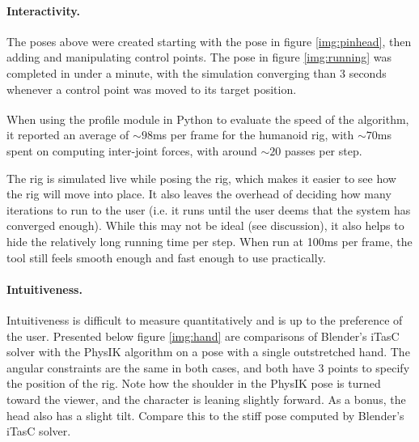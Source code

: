 \documentclass[10pt,twocolumn,letterpaper]{article}
\begin{document}
\paragraph{Interactivity.} The poses above were created starting with the pose in figure \ref{img:pinhead}, then adding and manipulating control points. The pose in figure \ref{img:running} was completed in under a minute, with the simulation converging than 3 seconds whenever a control point was moved to its target position.

When using the profile module in Python\textsuperscript{\cite{Pr}} to evaluate the speed of the algorithm, it reported an average of $\sim 98$ms per frame for the humanoid rig, with $\sim 70$ms spent on computing inter-joint forces, with around $\sim 20$ passes per step. 

The rig is simulated live while posing the rig, which makes it easier to see how the rig will move into place. It also leaves the overhead of deciding how many iterations to run to the user (i.e. it runs until the user deems that the system has converged enough). While this may not be ideal (see discussion), it also helps to hide the relatively long running time per step. When run at 100ms per frame, the tool still feels smooth enough and fast enough to use practically.

\paragraph{Intuitiveness.} Intuitiveness is difficult to measure quantitatively and is up to the preference of the user. Presented below figure \ref{img:hand} are comparisons of Blender's iTasC solver with the PhysIK algorithm on a pose with a single outstretched hand. The angular constraints are the same in both cases, and both have 3 points to specify the position of the rig. Note how the shoulder in the PhysIK pose is turned toward the viewer, and the character is leaning slightly forward. As a bonus, the head also has a slight tilt. Compare this to the stiff pose computed by Blender's iTasC solver. 
\end{document}
